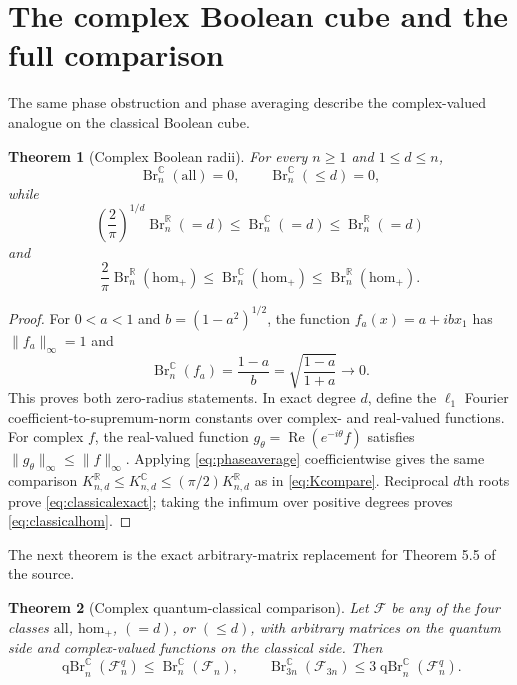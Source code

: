 \documentclass[11pt]{article}
\newtheorem{theorem}{Theorem}
\theoremstyle{remark}
\newcommand{\C}{\mathbb C}
\newcommand{\R}{\mathbb R}
\newcommand{\qBr}{\operatorname{qBr}}
\newcommand{\Br}{\operatorname{Br}}
\newcommand{\all}{\mathrm{all}}
\newcommand{\homc}{\mathrm{hom}}
\begin{document}
\section{The complex Boolean cube and the full comparison}

The same phase obstruction and phase averaging describe the complex-valued
analogue on the classical Boolean cube.

\begin{theorem}[Complex Boolean radii]\label{thm:classicalcomplex}
For every $n\geq1$ and $1\leq d\leq n$,
\[
 \Br_n^{\C}(\all)=0,
 \qquad
 \Br_n^{\C}(\leq d)=0,
\]
while
\begin{equation}\label{eq:classicalexact}
 \left(\frac2\pi\right)^{1/d}\Br_n^{\R}(=d)
 \leq\Br_n^{\C}(=d)
 \leq\Br_n^{\R}(=d)
\end{equation}
and
\begin{equation}\label{eq:classicalhom}
 \frac2\pi\Br_n^{\R}(\homc_+)
 \leq\Br_n^{\C}(\homc_+)
 \leq\Br_n^{\R}(\homc_+).
\end{equation}
\end{theorem}

\begin{proof}
For $0<a<1$ and $b=(1-a^2)^{1/2}$, the function
$f_a(x)=a+ibx_1$ has $\|f_a\|_\infty=1$ and
\[
 \Br_n^{\C}(f_a)=\frac{1-a}{b}
 =\sqrt{\frac{1-a}{1+a}}\longrightarrow0.
\]
This proves both zero-radius statements.  In exact degree $d$, define the
$\ell_1$ Fourier coefficient-to-supremum-norm constants over complex- and
real-valued functions.  For complex $f$, the real-valued function
$g_\theta=\operatorname{Re}(e^{-i\theta}f)$ satisfies
$\|g_\theta\|_\infty\leq\|f\|_\infty$.  Applying
\eqref{eq:phaseaverage} coefficientwise gives the same comparison
$K_{n,d}^{\R}\leq K_{n,d}^{\C}\leq(\pi/2)K_{n,d}^{\R}$ as in
\eqref{eq:Kcompare}.  Reciprocal $d$th roots prove
\eqref{eq:classicalexact}; taking the infimum over positive degrees proves
\eqref{eq:classicalhom}.
\end{proof}

The next theorem is the exact arbitrary-matrix replacement for Theorem 5.5
of the source.

\begin{theorem}[Complex quantum-classical comparison]\label{thm:fullcomparison}
Let $\mathcal F$ be any of the four classes $\all$, $\homc_+$, $(=d)$, or
$(\leq d)$, with arbitrary matrices on the quantum side and complex-valued
functions on the classical side.  Then
\begin{equation}\label{eq:fullcomparison}
 \boxed{
 \qBr_n^{\C}(\mathcal F_n^q)
 \leq\Br_n^{\C}(\mathcal F_n),
 \qquad
 \Br_{3n}^{\C}(\mathcal F_{3n})
 \leq3\qBr_n^{\C}(\mathcal F_n^q).}
\end{equation}
\end{theorem}
\end{document}
